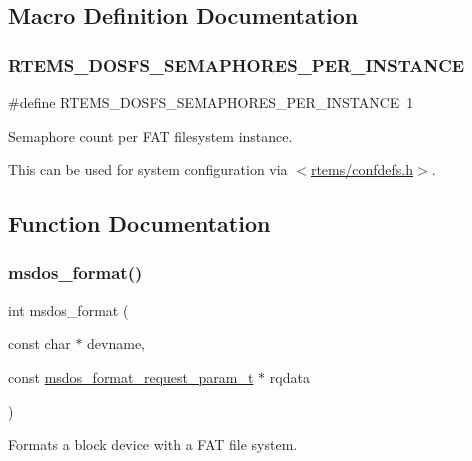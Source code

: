 \subsection{Macro Definition Documentation}
\mbox{\label{group__DOSFS_gaf5f22bc1798c9fd6a8f577ebd38aaa42}} 
\subsubsection{\texorpdfstring{RTEMS\_DOSFS\_SEMAPHORES\_PER\_INSTANCE}{RTEMS\_DOSFS\_SEMAPHORES\_PER\_INSTANCE}}
{\footnotesize\ttfamily \#define R\+T\+E\+M\+S\+\_\+\+D\+O\+S\+F\+S\+\_\+\+S\+E\+M\+A\+P\+H\+O\+R\+E\+S\+\_\+\+P\+E\+R\+\_\+\+I\+N\+S\+T\+A\+N\+CE~1}



Semaphore count per F\+AT filesystem instance. 

This can be used for system configuration via $<$\mbox{\hyperlink{confdefs_8h}{rtems/confdefs.\+h}}$>$. 

\subsection{Function Documentation}
\mbox{\label{group__DOSFS_ga89cdc98023478833b6291f2e3cea56f2}} 
\subsubsection{\texorpdfstring{msdos\_format()}{msdos\_format()}}
{\footnotesize\ttfamily int msdos\+\_\+format (\begin{DoxyParamCaption}\item[{const char $\ast$}]{devname,  }\item[{const \mbox{\hyperlink{structmsdos__format__request__param__t}{msdos\+\_\+format\+\_\+request\+\_\+param\+\_\+t}} $\ast$}]{rqdata }\end{DoxyParamCaption})}



Formats a block device with a F\+AT file system. 


